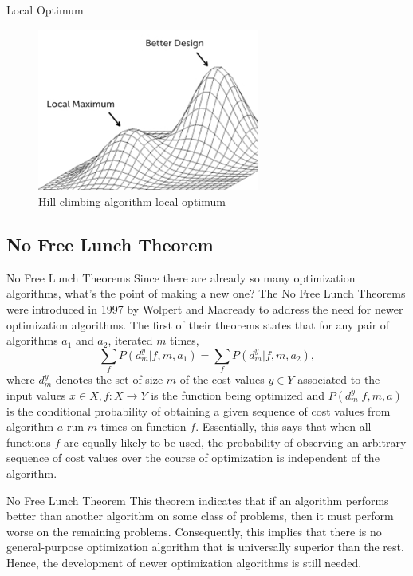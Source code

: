 \documentclass{beamer}
\begin{document}
\begin{frame}{Local Optimum}
\begin{figure}[h]
\begin{center}
\includegraphics[width=0.65\textwidth]{img/intro/hill_climbing}
\caption{Hill-climbing algorithm local optimum}
\end{center}
\end{figure}
\end{frame}

\subsection{No Free Lunch Theorem}
\begin{frame}{No Free Lunch Theorems}
Since there are already so many optimization algorithms, what's the point of making a new one? The No Free Lunch Theorems were introduced in 1997 by Wolpert and Macready to address the need for newer optimization algorithms. The first of their theorems states that for any pair of algorithms $a_1$ and $a_2$, iterated $m$ times, $$ \sum_{f} P(d_{m}^{y}|f,m,a_1)=\sum_{f} P(d_{m}^{y}|f,m,a_2),$$ where $d_m^y$ denotes the set of size $m$ of the cost values $y\in Y$ associated to the input values $x\in X,f:X\to Y$ is the function being optimized and $P(d_m^y|f,m,a)$ is the conditional probability of obtaining a given sequence of cost values from algorithm $a$ run $m$ times on function $f$. Essentially, this says that when all functions $f$ are equally likely to be used, the probability of observing an arbitrary sequence of cost values over the course of optimization is independent of the algorithm.
\end{frame}
\begin{frame}{No Free Lunch Theorem}
This theorem indicates that if an algorithm performs better than another algorithm on some class of problems, then it must perform worse on the remaining problems. Consequently, this implies that there is no general-purpose optimization algorithm that is universally superior than the rest. Hence, the development of newer optimization algorithms is still needed.
\end{frame}
\end{document}
